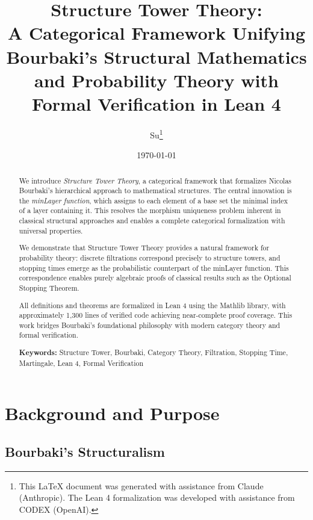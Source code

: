 \documentclass[11pt,a4paper]{article}
\title{%
  \textbf{Structure Tower Theory:}\\[0.3em]
  \large A Categorical Framework Unifying Bourbaki's Structural Mathematics\\
  and Probability Theory with Formal Verification in Lean 4
}
\author{%
  Su\thanks{%
    This \LaTeX{} document was generated with assistance from Claude (Anthropic). 
    The Lean 4 formalization was developed with assistance from CODEX (OpenAI).
  }
}
\date{\today}
\theoremstyle{plain}
\theoremstyle{definition}
\begin{document}
\maketitle

\begin{abstract}
We introduce \emph{Structure Tower Theory}, a categorical framework that 
formalizes Nicolas Bourbaki's hierarchical approach to mathematical structures. 
The central innovation is the \emph{minLayer function}, which assigns to each 
element of a base set the minimal index of a layer containing it. This 
resolves the morphism uniqueness problem inherent in classical structural 
approaches and enables a complete categorical formalization with universal 
properties.

We demonstrate that Structure Tower Theory provides a natural framework for 
probability theory: discrete filtrations correspond precisely to structure 
towers, and stopping times emerge as the probabilistic counterpart of the 
minLayer function. This correspondence enables purely algebraic proofs of 
classical results such as the Optional Stopping Theorem.

All definitions and theorems are formalized in Lean 4 using the Mathlib 
library, with approximately 1,300 lines of verified code achieving near-complete 
proof coverage. This work bridges Bourbaki's foundational philosophy with 
modern category theory and formal verification.

\medskip
\noindent\textbf{Keywords:} Structure Tower, Bourbaki, Category Theory, 
Filtration, Stopping Time, Martingale, Lean 4, Formal Verification
\end{abstract}

\tableofcontents
\newpage

\section{Background and Purpose}
\label{sec:background}

\subsection{Bourbaki's Structuralism}
\end{document}
